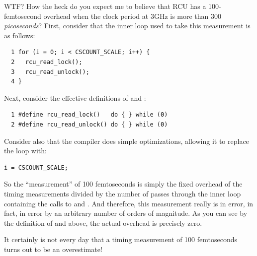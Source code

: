 \begin{enumerate}
\QuickQ{}
	WTF?
	How the heck do you expect me to believe that RCU has a
	100-femtosecond overhead when the clock period at 3GHz is more than
	300 \emph{picoseconds}?
\QuickA{}
	First, consider that the inner loop used to
	take this measurement is as follows:

\vspace{5pt}
\begin{minipage}[t]{\columnwidth}
\scriptsize
\begin{verbatim}
  1 for (i = 0; i < CSCOUNT_SCALE; i++) {
  2   rcu_read_lock();
  3   rcu_read_unlock();
  4 }
\end{verbatim}
\end{minipage}
\vspace{5pt}

	Next, consider the effective definitions of 
	and :

\vspace{5pt}
\begin{minipage}[t]{\columnwidth}
\scriptsize
\begin{verbatim}
  1 #define rcu_read_lock()   do { } while (0)
  2 #define rcu_read_unlock() do { } while (0)
\end{verbatim}
\end{minipage}
\vspace{5pt}

	Consider also that the compiler does simple optimizations,
	allowing it to replace the loop with:

\vspace{5pt}
\begin{minipage}[t]{\columnwidth}
\scriptsize
\begin{verbatim}
i = CSCOUNT_SCALE;
\end{verbatim}
\end{minipage}
\vspace{5pt}

	So the ``measurement'' of 100 femtoseconds is simply the fixed
	overhead of the timing measurements divided by the number of
	passes through the inner loop containing the calls
	to  and .
	And therefore, this measurement really is in error, in fact,
	in error by an arbitrary number of orders of magnitude.
	As you can see by the definition of 
	and  above, the actual overhead
	is precisely zero.

	It certainly is not every day that a timing measurement of
	100 femtoseconds turns out to be an overestimate!


\end{enumerate}
